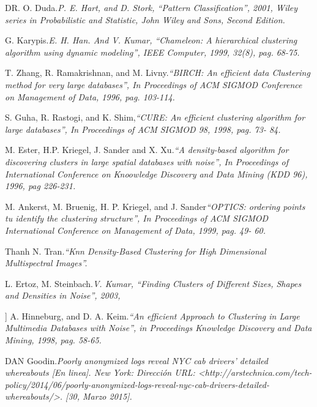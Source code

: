 \documentclass[a4paper, 12pt, oneside]{article}
\theoremstyle{definition}
\theoremstyle{remark}
\begin{document}
\begin{thebibliography}{99}

DR. O. Duda.\emph{P. E. Hart, and D. Stork, “Pattern Classification”, 2001, Wiley series in Probabilistic and Statistic, John Wiley and Sons, Second Edition.}

 G. Karypis.\emph{E. H. Han. And V. Kumar, “Chameleon: A hierarchical clustering algorithm using dynamic modeling”, IEEE Computer, 1999, 32(8), pag. 68-75.}

T. Zhang, R. Ramakrishnan, and M. Livny.\emph{“BIRCH: An efficient data Clustering method for very large databases”, In Proceedings of ACM SIGMOD Conference on Management of Data, 1996, pag. 103-114.}

S. Guha, R. Rastogi, and K. Shim,\emph{“CURE: An efficient clustering algorithm for large databases”, In Proceedings of ACM SIGMOD 98, 1998, pag. 73- 84.}

M. Ester, H.P. Kriegel, J. Sander and X. Xu.\emph{“A density-based algorithm for discovering clusters in large spatial databases with noise”, In Proceedings of International Conference on Knoowledge Discovery and Data Mining (KDD 96), 1996, pag 226-231.}

M. Ankerst, M. Bruenig, H. P. Kriegel, and J. Sander\emph{“OPTICS: ordering points tu identify the clustering structure”, In Proceedings of ACM SIGMOD International Conference on Management of Data, 1999, pag. 49- 60.}

Thanh N. Tran.\emph{“Knn Density-Based Clustering for High Dimensional Multispectral Images”.}

L. Ertoz, M. Steinbach.\emph{V. Kumar, “Finding Clusters of Different Sizes, Shapes and Densities in Noise”, 2003,}

\bibitem[9]{] A. Hinneburg, and D. A. Keim.}] A. Hinneburg, and D. A. Keim.\emph{“An efficient Approach to Clustering in Large Multimedia Databases with Noise”, in Proceedings Knowledge Discovery and Data Mining, 1998, pag. 58-65.}


DAN Goodin.\emph{Poorly anonymized logs reveal NYC cab drivers’ detailed whereabouts [En linea]. New York: Dirección URL: <http://arstechnica.com/tech-policy/2014/06/poorly-anonymized-logs-reveal-nyc-cab-drivers-detailed-whereabouts/>. [30, Marzo 2015].}


\end{thebibliography}
\end{document}
